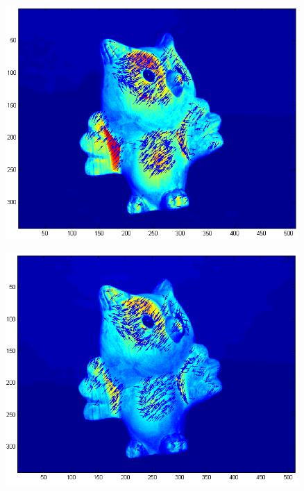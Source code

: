\documentclass[11pt,psfig]{article}
\begin{document}
\begin{figure}[H]
\centering
\includegraphics[height=3.5in]{prob3figure4.png}
\end{figure}
\begin{figure}[H]
\centering
\includegraphics[height=3.5in]{prob3figure5.png}
\end{figure}
\end{document}
